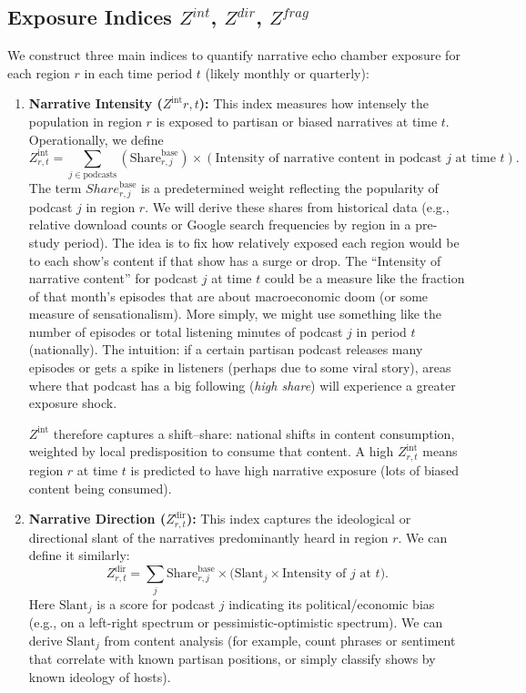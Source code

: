 \documentclass[12pt]{article}
\begin{document}
\subsection{Exposure Indices $Z^{int}$, $Z^{dir}$, $Z^{frag}$}
We construct three main indices to quantify narrative echo chamber exposure for each region $r$ in each time period $t$ (likely monthly or quarterly):
\begin{enumerate}
    \item \textbf{Narrative Intensity ($Z^{\text{int}}{r,t}$):} This index measures how intensely the population in region $r$ is exposed to partisan or biased narratives at time $t$. Operationally, we define
          $$
              Z_{r,t}^\text{int} =\sum_{j \in \text{podcasts}}(\text{Share}_{r,j}^\text{base}  ) \times(\text{Intensity of narrative content in podcast } j \text{ at time } t).
          $$
          The term ${Share}_{r,j}^\text{base}$ is a predetermined weight reflecting the popularity of podcast $j$ in region $r$. We will derive these shares from historical data (e.g., relative download counts or Google search frequencies by region in a pre-study period). The idea is to fix how relatively exposed each region would be to each show's content if that show has a surge or drop.
          The ``Intensity of narrative content'' for podcast $j$ at time $t$ could be a measure like the fraction of that month's episodes that are about macroeconomic doom (or some measure of sensationalism). More simply, we might use something like the number of episodes or total listening minutes of podcast $j$ in period $t$ (nationally). The intuition: if a certain partisan podcast releases many episodes or gets a spike in listeners (perhaps due to some viral story), areas where that podcast has a big following (\textit{high share}) will experience a greater exposure shock.

          $Z^{\text{int}}$ therefore captures a shift--share: national shifts in content consumption, weighted by local predisposition to consume that content. A high $Z^{\text{int}}_{r,t}$ means region $r$ at time $t$ is predicted to have high narrative exposure (lots of biased content being consumed).

    \item \textbf{Narrative Direction ($Z^{\text{dir}}_{r,t}$):} This index captures the ideological or directional slant of the narratives predominantly heard in region $r$. We can define it similarly:
          \[
              Z^{\text{dir}}_{r,t} = \sum_{j} \text{Share}_{r,j}^{\text{base}} \times \Big( \text{Slant}_{j} \times \text{Intensity of $j$ at $t$} \Big).
          \]
          Here $\text{Slant}_{j}$ is a score for podcast $j$ indicating its political/economic bias (e.g., on a left-right spectrum or pessimistic-optimistic spectrum). We can derive $\text{Slant}_{j}$ from content analysis (for example, count phrases or sentiment that correlate with known partisan positions, or simply classify shows by known ideology of hosts).


\end{enumerate}
\end{document}
